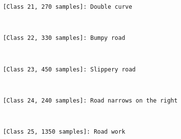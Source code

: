 \documentclass[11pt]{article}
\begin{document}
    \begin{Verbatim}[commandchars=\\\{\}]
[Class 21, 270 samples]: Double curve

    \end{Verbatim}

    \begin{center}
    \end{center}
    { \hspace*{\fill} \\}
    
    \begin{Verbatim}[commandchars=\\\{\}]
[Class 22, 330 samples]: Bumpy road

    \end{Verbatim}

    \begin{center}
    \end{center}
    { \hspace*{\fill} \\}
    
    \begin{Verbatim}[commandchars=\\\{\}]
[Class 23, 450 samples]: Slippery road

    \end{Verbatim}

    \begin{center}
    \end{center}
    { \hspace*{\fill} \\}
    
    \begin{Verbatim}[commandchars=\\\{\}]
[Class 24, 240 samples]: Road narrows on the right

    \end{Verbatim}

    \begin{center}
    \end{center}
    { \hspace*{\fill} \\}
    
    \begin{Verbatim}[commandchars=\\\{\}]
[Class 25, 1350 samples]: Road work

    \end{Verbatim}
\end{document}
